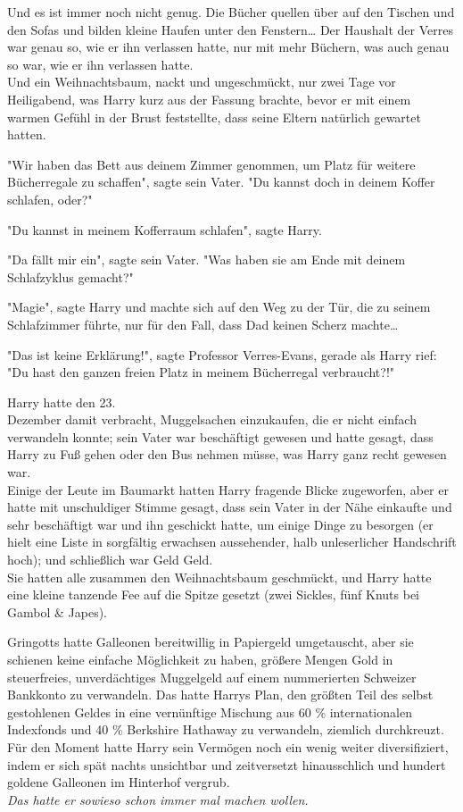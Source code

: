 {Und es ist immer noch nicht genug. Die Bücher quellen über auf den Tischen und den Sofas und bilden kleine Haufen unter den Fenstern… Der Haushalt der Verres war genau so, wie er ihn verlassen hatte, nur mit mehr Büchern, was auch genau so war, wie er ihn verlassen hatte.\\ Und ein Weihnachtsbaum, nackt und ungeschmückt, nur zwei Tage vor Heiligabend, was Harry kurz aus der Fassung brachte, bevor er mit einem warmen Gefühl in der Brust feststellte, dass seine Eltern natürlich gewartet hatten.

"Wir haben das Bett aus deinem Zimmer genommen, um Platz für weitere Bücherregale zu schaffen", sagte sein Vater. "Du kannst doch in deinem Koffer schlafen, oder?"

"Du kannst in meinem Kofferraum schlafen", sagte Harry.

"Da fällt mir ein", sagte sein Vater. "Was haben sie am Ende mit deinem Schlafzyklus gemacht?"

"Magie", sagte Harry und machte sich auf den Weg zu der Tür, die zu seinem Schlafzimmer führte, nur für den Fall, dass Dad keinen Scherz machte…

"Das ist keine Erklärung!", sagte Professor Verres-Evans, gerade als Harry rief:\\ "Du hast den ganzen freien Platz in meinem Bücherregal verbraucht?!"

Harry hatte den 23.\\ Dezember damit verbracht, Muggelsachen einzukaufen, die er nicht einfach verwandeln konnte; sein Vater war beschäftigt gewesen und hatte gesagt, dass Harry zu Fuß gehen oder den Bus nehmen müsse, was Harry ganz recht gewesen war.\\ Einige der Leute im Baumarkt hatten Harry fragende Blicke zugeworfen, aber er hatte mit unschuldiger Stimme gesagt, dass sein Vater in der Nähe einkaufte und sehr beschäftigt war und ihn geschickt hatte, um einige Dinge zu besorgen (er hielt eine Liste in sorgfältig erwachsen aussehender, halb unleserlicher Handschrift hoch); und schließlich war Geld Geld.\\ Sie hatten alle zusammen den Weihnachtsbaum geschmückt, und Harry hatte eine kleine tanzende Fee auf die Spitze gesetzt (zwei Sickles, fünf Knuts bei Gambol \& Japes).

Gringotts hatte Galleonen bereitwillig in Papiergeld umgetauscht, aber sie schienen keine einfache Möglichkeit zu haben, größere Mengen Gold in steuerfreies, unverdächtiges Muggelgeld auf einem nummerierten Schweizer Bankkonto zu verwandeln. Das hatte Harrys Plan, den größten Teil des selbst gestohlenen Geldes in eine vernünftige Mischung aus 60 \% internationalen Indexfonds und 40 \% Berkshire Hathaway zu verwandeln, ziemlich durchkreuzt. Für den Moment hatte Harry sein Vermögen noch ein wenig weiter diversifiziert, indem er sich spät nachts unsichtbar und zeitversetzt hinausschlich und hundert goldene Galleonen im Hinterhof vergrub.\\ \emph{Das hatte er sowieso schon immer mal machen wollen.}

}
